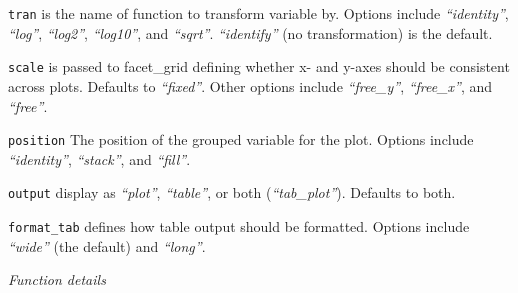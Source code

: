\documentclass[
]{article}
\begin{document}
\begin{description}
\texttt{tran} is the name of function to transform variable by. Options include \emph{``identity''}, \emph{``log''}, \emph{``log2''}, \emph{``log10''}, and \emph{``sqrt''}. \emph{``identify''} (no transformation) is the default.

\texttt{scale} is passed to facet\_grid defining whether x- and y-axes should be consistent across plots. Defaults to \emph{``fixed''}. Other options include \emph{``free\_y''}, \emph{``free\_x''}, and \emph{``free''}.

\texttt{position} The position of the grouped variable for the plot. Options include \emph{``identity''}, \emph{``stack''}, and \emph{``fill''}.

\texttt{output} display as \emph{``plot''}, \emph{``table''}, or both (\emph{``tab\_plot''}). Defaults to both.

\texttt{format\_tab} defines how table output should be formatted. Options include \emph{``wide''} (the default) and \emph{``long''}.
\end{description}

\emph{Function details}
\end{document}
